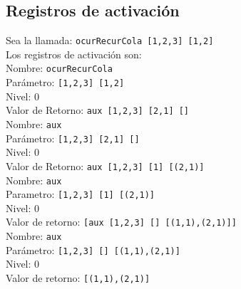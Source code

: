 \documentclass{article}
\begin{document}
\subsection*{Registros de activación}
Sea la llamada: \texttt{ocurRecurCola [1,2,3] [1,2]}\\
\newline
Los registros de activación son:\\
\newline
Nombre: \texttt{ocurRecurCola}\\
Parámetro: \texttt{[1,2,3] [1,2]}\\
Nivel: 0\\
Valor de Retorno: \texttt{aux [1,2,3] [2,1] []}\\
\newline
Nombre: \texttt{aux}\\
Parámetro: \texttt{[1,2,3] [2,1] []}\\
Nivel: 0\\
Valor de Retorno: \texttt{aux [1,2,3] [1] [(2,1)]}\\
\newline
Nombre: \texttt{aux}\\
Parametro: \texttt{[1,2,3] [1] [(2,1)]}\\
Nivel: 0\\
Valor de retorno: \texttt{[aux [1,2,3] [] [(1,1),(2,1)]]}\\
\newline
Nombre: \texttt{aux}\\
Parámetro: \texttt{[1,2,3] [] [(1,1),(2,1)]}\\
Nivel: 0\\
Valor de retorno: \texttt{[(1,1),(2,1)]}\\
\end{document}
